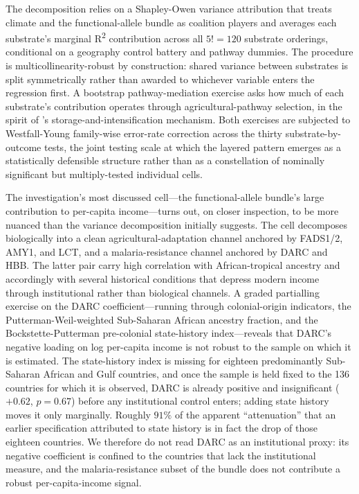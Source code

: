 \documentclass[11pt,letterpaper]{article}
\begin{document}
The decomposition relies on a Shapley-Owen variance attribution that treats climate and the functional-allele bundle as coalition players and averages each substrate's marginal R\textsuperscript{2} contribution across all $5!=120$ substrate orderings, conditional on a geography control battery and pathway dummies. The procedure is multicollinearity-robust by construction: shared variance between substrates is split symmetrically rather than awarded to whichever variable enters the regression first. A bootstrap pathway-mediation exercise asks how much of each substrate's contribution operates through agricultural-pathway selection, in the spirit of \citet{matranga2024}'s storage-and-intensification mechanism. Both exercises are subjected to Westfall-Young family-wise error-rate correction across the thirty substrate-by-outcome tests, the joint testing scale at which the layered pattern emerges as a statistically defensible structure rather than as a constellation of nominally significant but multiply-tested individual cells.

The investigation's most discussed cell---the functional-allele bundle's large contribution to per-capita income---turns out, on closer inspection, to be more nuanced than the variance decomposition initially suggests. The cell decomposes biologically into a clean agricultural-adaptation channel anchored by FADS1/2, AMY1, and LCT, and a malaria-resistance channel anchored by DARC and HBB. The latter pair carry high correlation with African-tropical ancestry and accordingly with several historical conditions that depress modern income through institutional rather than biological channels. A graded partialling exercise on the DARC coefficient---running through colonial-origin indicators, the Putterman-Weil-weighted Sub-Saharan African ancestry fraction, and the Bockstette-Putterman pre-colonial state-history index---reveals that DARC's negative loading on log per-capita income is not robust to the sample on which it is estimated. The state-history index is missing for eighteen predominantly Sub-Saharan African and Gulf countries, and once the sample is held fixed to the 136 countries for which it is observed, DARC is already positive and insignificant ($+0.62$, $p=0.67$) before any institutional control enters; adding state history moves it only marginally. Roughly $91\%$ of the apparent ``attenuation'' that an earlier specification attributed to state history is in fact the drop of those eighteen countries. We therefore do not read DARC as an institutional proxy: its negative coefficient is confined to the countries that lack the institutional measure, and the malaria-resistance subset of the bundle does not contribute a robust per-capita-income signal.
\end{document}
